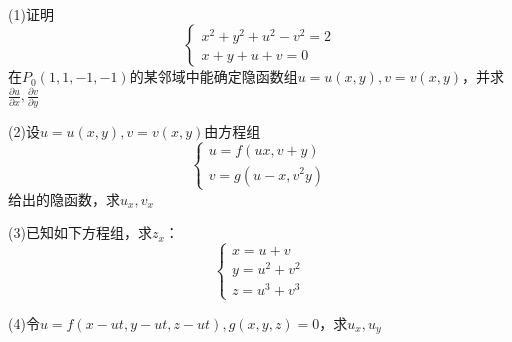 ~

\begin{exercise}[隐函数组求导]
  (1)证明
  \begin{equation*}
    \begin{cases}
      x^2 + y^2 + u^2 - v^2 = 2\\
      x+y+u+v = 0
    \end{cases}
  \end{equation*}
  在$P_0(1,1,-1,-1)$的某邻域中能确定隐函数组$u = u(x,y), v = v(x,y)$，并求$\frac{\partial u}{\partial x}, \frac{\partial v}{\partial y}$

  (2)设$u = u(x,y), v = v(x,y)$由方程组
  \begin{equation*}
    \begin{cases}
      u = f(ux,v+y)\\
      v = g(u-x,v^2y)
    \end{cases}
  \end{equation*}
  给出的隐函数，求$u_x, v_x$

  (3)已知如下方程组，求$z_x$：
  \begin{equation*}
    \begin{cases}
      x = u+v\\
      y = u^2 + v^2\\
      z = u^3 + v^3
    \end{cases}
  \end{equation*}

  (4)令$u = f(x-ut, y-ut, z - ut), g(x,y,z) = 0$，求$u_x,u_y$
\end{exercise}

